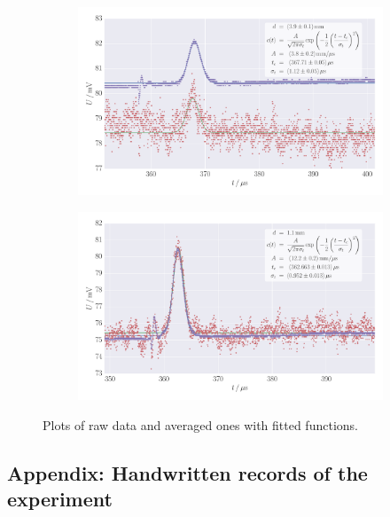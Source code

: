 \begin{figure}
    \centering
    \begin{subfigure}[b]{\pltw}
        \includegraphics[width=1.0\linewidth]{figures/haynes_shockley_raw_26}
        \caption{}
        \label{fig:h_s_raw_26}
    \end{subfigure}
    \begin{subfigure}[b]{\pltw}
        \includegraphics[width=1.0\linewidth]{figures/haynes_shockley_raw_33}
        \caption{}
        \label{fig:h_s_raw_33}
    \end{subfigure}
    \caption{
        Plots of raw data and averaged ones with fitted functions. 
        }
    \label{fig:h_s_raw_plots}
\end{figure}



\subsection{Appendix: Handwritten records of the experiment}
    \label{sec:records_band_gap}
\clearpage

